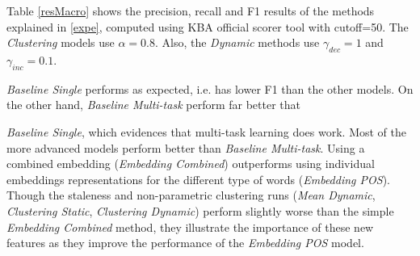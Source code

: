 \documentclass{article}
\newcommand{\todo}[1]{\noindent{\textcolor{red}{\{{\bf TODO:}  #1\}}}}
\begin{document}

Table \ref{resMacro} shows the precision, recall and F1 results of the methods explained in \ref{expe}, computed using KBA official scorer tool with cutoff=50. The \textit{Clustering} models use $\alpha=0.8$. Also, the \textit{Dynamic} methods use $\gamma_{dec}=1$ and $\gamma_{inc}=0.1$.
{\textit{Baseline Single} performs as expected, i.e. has lower F1 than the other models. 
On the other hand, {\textit{Baseline Multi-task}} perform far better that {\textit{Baseline Single}, which evidences that multi-task learning does work.
Most of the more advanced models perform better than {\textit{Baseline Multi-task}}. Using a combined embedding ({\textit{Embedding Combined}}) outperforms using individual embeddings representations for the different type of words ({\textit{Embedding POS}}).
Though the staleness and non-parametric clustering runs ({\textit{Mean Dynamic}}, {\textit{Clustering Static}}, {\textit{Clustering Dynamic}}) perform slightly worse than the simple {\textit{Embedding Combined}} method, they illustrate the importance of these new features as they improve the performance of the {\textit{Embedding POS}} model.


}}
\end{document}
